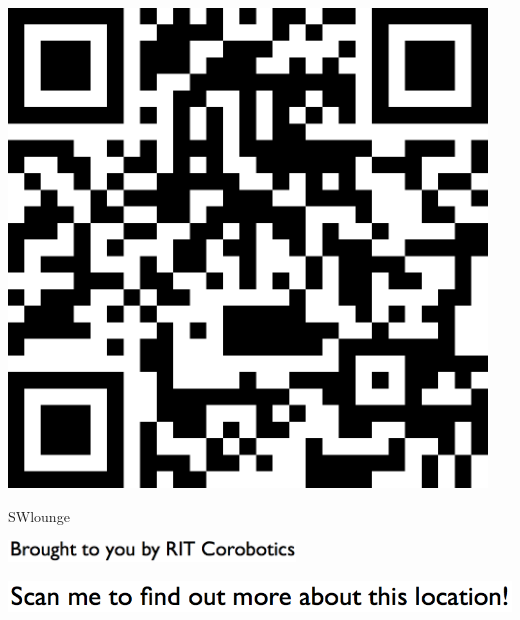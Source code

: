 \documentclass[letterpaper]{article}
\begin{document}
 \begingroup 
 \centerline{\includegraphics[scale=1,width=5in,height=5in]{SWlounge.png}} 
 \endgroup 
 \vspace*{\fill} 

 \hfill{\small SWlounge} 

  \vspace{0.7in} 
 
 \centerline{\includegraphics[scale=1,width=3in]{text-bottom.png}} 
 
 \pagebreak 
{} 
 \vspace*{\fill} 
 
  \centerline{\includegraphics[scale=1,width=6in]{text-top.png}} 
 
 \vspace{0.5in} 
 
\end{document}
